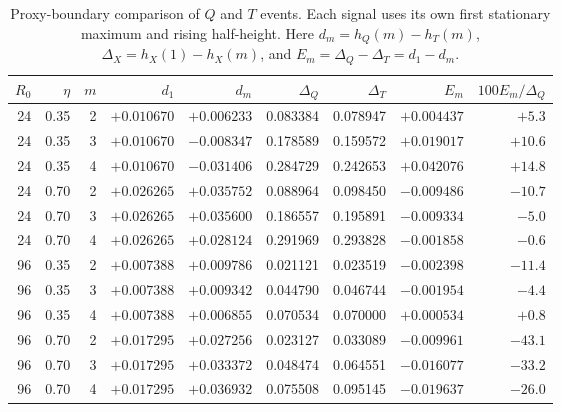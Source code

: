 \begin{table}[htbp]
\centering\scriptsize
\caption{Proxy-boundary comparison of $Q$ and $T$ events. Each signal uses its own first stationary maximum and rising half-height. Here $d_m=h_Q(m)-h_T(m)$, $\Delta_X=h_X(1)-h_X(m)$, and $E_m=\Delta_Q-\Delta_T=d_1-d_m$.}
\label{tab:qt-events}
\begin{tabular}{rrr@{\quad}rrrrrr}
\toprule
$R_0$ & $\eta$ & $m$ & $d_1$ & $d_m$ & $\Delta_Q$ & $\Delta_T$ & $E_m$ & $100E_m/\Delta_Q$ \\
\midrule
24 & 0.35 & 2 & $+0.010670$ & $+0.006233$ & 0.083384 & 0.078947 & $+0.004437$ & $+5.3$ \\
24 & 0.35 & 3 & $+0.010670$ & $-0.008347$ & 0.178589 & 0.159572 & $+0.019017$ & $+10.6$ \\
24 & 0.35 & 4 & $+0.010670$ & $-0.031406$ & 0.284729 & 0.242653 & $+0.042076$ & $+14.8$ \\
24 & 0.70 & 2 & $+0.026265$ & $+0.035752$ & 0.088964 & 0.098450 & $-0.009486$ & $-10.7$ \\
24 & 0.70 & 3 & $+0.026265$ & $+0.035600$ & 0.186557 & 0.195891 & $-0.009334$ & $-5.0$ \\
24 & 0.70 & 4 & $+0.026265$ & $+0.028124$ & 0.291969 & 0.293828 & $-0.001858$ & $-0.6$ \\
96 & 0.35 & 2 & $+0.007388$ & $+0.009786$ & 0.021121 & 0.023519 & $-0.002398$ & $-11.4$ \\
96 & 0.35 & 3 & $+0.007388$ & $+0.009342$ & 0.044790 & 0.046744 & $-0.001954$ & $-4.4$ \\
96 & 0.35 & 4 & $+0.007388$ & $+0.006855$ & 0.070534 & 0.070000 & $+0.000534$ & $+0.8$ \\
96 & 0.70 & 2 & $+0.017295$ & $+0.027256$ & 0.023127 & 0.033089 & $-0.009961$ & $-43.1$ \\
96 & 0.70 & 3 & $+0.017295$ & $+0.033372$ & 0.048474 & 0.064551 & $-0.016077$ & $-33.2$ \\
96 & 0.70 & 4 & $+0.017295$ & $+0.036932$ & 0.075508 & 0.095145 & $-0.019637$ & $-26.0$ \\
\bottomrule
\end{tabular}
\end{table}
